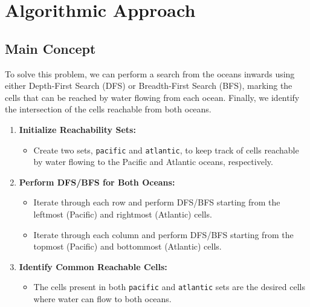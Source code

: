 
\section*{Algorithmic Approach}

\subsection*{Main Concept}
To solve this problem, we can perform a search from the oceans inwards using either Depth-First Search (DFS) or Breadth-First Search (BFS), marking the cells that can be reached by water flowing from each ocean. Finally, we identify the intersection of the cells reachable from both oceans.

\begin{enumerate}
    \item \textbf{Initialize Reachability Sets:}
    \begin{itemize}
        \item Create two sets, \texttt{pacific} and \texttt{atlantic}, to keep track of cells reachable by water flowing to the Pacific and Atlantic oceans, respectively.
    \end{itemize}
    
    \item \textbf{Perform DFS/BFS for Both Oceans:}
    \begin{itemize}
        \item Iterate through each row and perform DFS/BFS starting from the leftmost (Pacific) and rightmost (Atlantic) cells.
        \item Iterate through each column and perform DFS/BFS starting from the topmost (Pacific) and bottommost (Atlantic) cells.
    \end{itemize}
    
    \item \textbf{Identify Common Reachable Cells:}
    \begin{itemize}
        \item The cells present in both \texttt{pacific} and \texttt{atlantic} sets are the desired cells where water can flow to both oceans.
    \end{itemize}
\end{enumerate}

